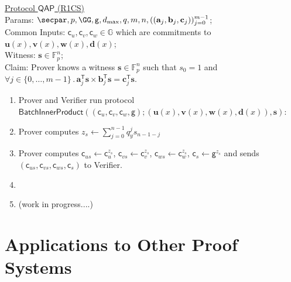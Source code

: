 \documentclass{article}
\begin{document}
\begin{small}
\noindent\begin{minipage}{\textwidth}
\begin{mdframed}[userdefinedwidth=1\textwidth]  \label{prot:QAP}
\newcommand{\qap}{$\mathsf{QAP}$}
	\noindent \underline{\textsf{Protocol \qap} (R1CS)}\\
\noindent Params: $\secpar,p,\GG, \mathsf{g}, d_{\max},q, m, n, ((\mathbf{a}_j, \mathbf{b}_j, \mathbf{c}_j))_{j=0}^{m-1}$; \\
Common Inputs: $\mathsf{c}_u, \mathsf{c}_v, \mathsf{c}_w \in \mathbb{G}$ which are commitments to $\mathbf{u}(x), \mathbf{v}(x), \mathbf{w}(x), \mathbf{d}(x)$; \\
Witness: $\mathbf{s} \in \mathbb{F}_p^n$; \\ 
Claim: Prover knows a witness $\mathbf{s} \in \mathbb{F}_p^n$ such that $s_0 = 1$ and $\forall j \in \{0,\ldots,m-1\} \, . \, \mathbf{a}_j^\mathsf{T} \mathbf{s} \times \mathbf{b}_j^\mathsf{T} \mathbf{s} = \mathbf{c}_j^\mathsf{T} \mathbf{s}$.

\begin{enumerate}[nolistsep]
\item Prover and Verifier run protocol \\ $\mathsf{BatchInnerProduct}((\mathsf{c}_u, \mathsf{c}_v, \mathsf{c}_w, \mathsf{g}); (\mathbf{u}(x), \mathbf{v}(x), \mathbf{w}(x), \mathbf{d}(x)), \mathbf{s})$:
\item \pcind[1] Prover computes $z_s \gets \sum_{j=0}^{n-1} q_y^j s_{n-1-j}$
\item \pcind[1] Prover computes $\mathsf{c}_{us} \gets \mathsf{c}_u^{z_s}$,  $\mathsf{c}_{vs} \gets \mathsf{c}_v^{z_s}$,  $\mathsf{c}_{ws} \gets \mathsf{c}_w^{z_s}$,  $\mathsf{c}_{s} \gets \mathsf{g}^{z_s}$ and sends $(\mathsf{c}_{us}, \mathsf{c}_{vs}, \mathsf{c}_{ws}, \mathsf{c}_{s})$ to Verifier.
\item[] \pcind[1] 
\item (work in progress....)
\end{enumerate}
\end{mdframed}
\end{minipage}
\end{small}

\section{Applications to Other Proof Systems}
\end{document}
